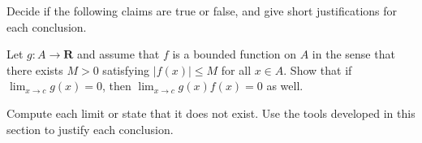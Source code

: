 \begin{solution}
  \enum{
  \item \TODO
  \item \TODO
  \item \TODO
  \item \TODO
  }
\end{solution}


\begin{exercise}
  Decide if the following claims are true or false, and give short justifications for each conclusion.
\end{exercise}

\begin{solution}
  \enum{
  \item \TODO
  \item \TODO
  \item \TODO
  \item \TODO
  }
\end{solution}

\begin{exercise}
  Let $g: A \rightarrow \mathbf{R}$ and assume that $f$ is a bounded function on $A$ in the sense that there exists $M>0$ satisfying $|f(x)| \leq M$ for all $x \in A$.
Show that if $\lim _{x \rightarrow c} g(x)=0$, then $\lim _{x \rightarrow c} g(x) f(x)=0$ as well.
\end{exercise}

\begin{solution}
  \TODO
\end{solution}

\begin{exercise}
  Compute each limit or state that it does not exist. Use the tools developed in this section to justify each conclusion.
\end{exercise}

\begin{solution}
  \enum{
  \item \TODO
  \item \TODO
  \item \TODO
  \item \TODO
  }
\end{solution}

